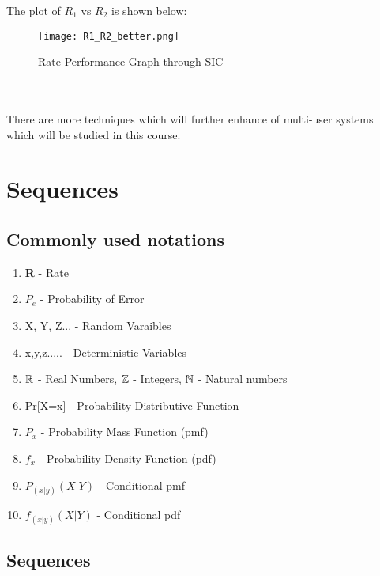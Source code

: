 \documentclass[a4paper]{article}
\begin{document}
\begin{enumerate}
The plot of $R_1$ vs $R_2$ is shown below:
\begin{figure}[!ht]
\centering
\texttt{[image: R1\_R2\_better.png]}
\caption{Rate Performance Graph through SIC}\label{fig:5}
\end{figure} \\
\\There are more techniques which will further enhance of multi-user systems which will be studied in this course.
\end{enumerate}
\bigskip
\section{Sequences}
\subsection{Commonly used notations}
\begin{enumerate}
\item \textbf{R} - Rate
\item $P_e$ - Probability of Error
\item X, Y, Z...  - Random Varaibles
\item x,y,z..... - Deterministic Variables
\item $\mathbb R$ - Real Numbers, $\mathbb Z$ - Integers, $\mathbb N$ - Natural numbers
\item Pr[X=x] - Probability Distributive Function
\item $P_x$ - Probability Mass Function (pmf)
\item $f_x$ - Probability Density Function (pdf)
\item $P_{(x|y)}(X|Y)$ - Conditional pmf
\item $f_{(x|y)}(X|Y)$ - Conditional pdf
\end{enumerate}
\subsection{Sequences}
\end{document}
